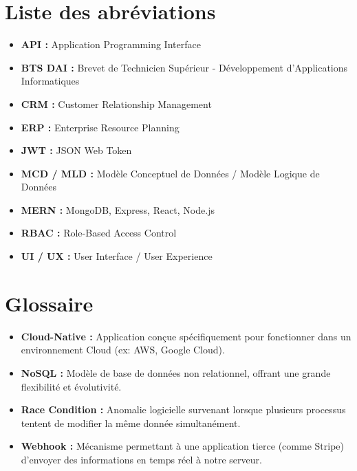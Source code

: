 \documentclass[12pt, a4paper]{report}
\begin{document}
\chapter*{Liste des abréviations}
\begin{itemize}
    \item \textbf{API :} Application Programming Interface
    \item \textbf{BTS DAI :} Brevet de Technicien Supérieur - Développement d'Applications Informatiques
    \item \textbf{CRM :} Customer Relationship Management
    \item \textbf{ERP :} Enterprise Resource Planning
    \item \textbf{JWT :} JSON Web Token
    \item \textbf{MCD / MLD :} Modèle Conceptuel de Données / Modèle Logique de Données
    \item \textbf{MERN :} MongoDB, Express, React, Node.js
    \item \textbf{RBAC :} Role-Based Access Control
    \item \textbf{UI / UX :} User Interface / User Experience
\end{itemize}

\chapter*{Glossaire}
\begin{itemize}
    \item \textbf{Cloud-Native :} Application conçue spécifiquement pour fonctionner dans un environnement Cloud (ex: AWS, Google Cloud).
    \item \textbf{NoSQL :} Modèle de base de données non relationnel, offrant une grande flexibilité et évolutivité.
    \item \textbf{Race Condition :} Anomalie logicielle survenant lorsque plusieurs processus tentent de modifier la même donnée simultanément.
    \item \textbf{Webhook :} Mécanisme permettant à une application tierce (comme Stripe) d'envoyer des informations en temps réel à notre serveur.
\end{itemize}

\tableofcontents
\listoffigures
\listoftables
\newpage


\end{document}
